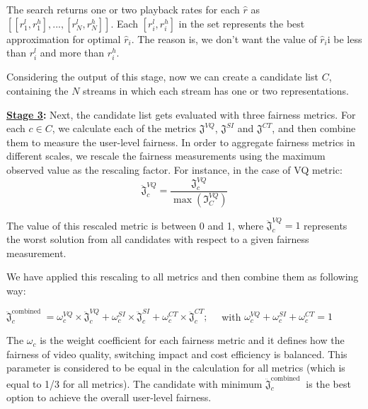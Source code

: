 \documentclass[12pt]{article}
\begin{document}
The search returns one or two playback rates for each $\hat{r}$ as $[[r_1^l,r_1^h ],...,[r_N^l,r_N^h ]]$. Each $[r_i^l,r_i^h]$ in the set represents the best approximation for optimal $\hat{r}_i$. The reason is, we don’t want the value of $\hat{r}_i$i be less than $r_i^l$ and more than $r_i^h$. 

Considering the output of this stage, now we can create a candidate list $C$, containing the $N$ streams in which each stream has one or two representations.

\textbf{\underline{Stage 3}:} Next, the candidate list gets evaluated with three fairness metrics. For each $c\in C$, we calculate each of the metrics $\mathfrak{J}^{V Q}$, $\mathfrak{J}^{S I}$ and $\mathfrak{J}^{C T}$, and then combine them to measure the user-level fairness. In order to aggregate fairness metrics in different scales, we rescale the fairness measurements using the maximum observed value as the rescaling factor. For instance, in the case of VQ metric:
\begin{equation}
\ddot{\mathfrak{J}}_{c}^{V Q}=\frac{\mathfrak{J}_{c}^{V Q}}{\max \left(\mathfrak{I}_{C}^{V Q}\right)}
\end{equation}

The value of this rescaled metric is between 0 and 1, where $\ddot{\mathfrak{J}}_{c}^{V Q}=1$ represents the worst solution from all candidates with respect to a given fairness measurement. 

We have applied this rescaling to all metrics and then combine them as following way:

$\ddot{\mathfrak{J}}_{c}^{\text {combined }}=\omega_{c}^{V Q} \times \ddot{\mathfrak{J}}_{c}^{V Q}+\omega_{c}^{S I} \times \ddot{\mathfrak{J}}_{c}^{S I}+\omega_{c}^{C T} \times \ddot{\mathfrak{J}}_{c}^{C T} ; \quad$ with $\omega_{c}^{V Q}+\omega_{c}^{S I}+\omega_{c}^{C T}=1$

The $\omega_c$ is the weight coefficient for each fairness metric and it defines how the fairness of video quality, switching impact and cost efficiency is balanced. This parameter is considered to be equal in the calculation for all metrics (which is equal to 1/3 for all metrics).
The candidate with minimum $\ddot{\mathfrak{J}}_{c}^{\text {combined }}$ is the best option to achieve the overall user-level fairness.

\end{document}

